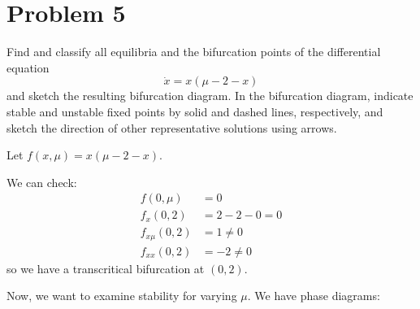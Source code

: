 \documentclass[12pt]{article}
\begin{document}

\pagebreak
\section*{Problem 5}

Find and classify all equilibria and the bifurcation points of the differential equation
\[
    \dot{x} = x (\mu - 2 - x)
\]
and sketch the resulting bifurcation diagram. In the bifurcation diagram, indicate stable and unstable fixed points by solid and dashed lines, respectively, and sketch the direction of other representative solutions using arrows.

\color{blue}
Let $f(x, \mu) = x(\mu - 2 - x)$.

We can check:
\begin{align*}
    f(0, \mu)      & = 0             \\
    f_x(0, 2)      & = 2 - 2 - 0 = 0 \\
    f_{x\mu}(0, 2) & = 1 \neq 0      \\
    f_{xx}(0, 2)   & = -2 \neq 0
\end{align*}
so we have a transcritical bifurcation at $(0, 2)$.

Now, we want to examine stability for varying $\mu$. We have phase diagrams:
\end{document}
